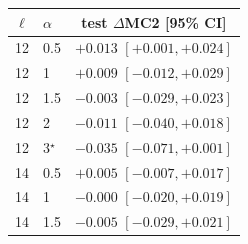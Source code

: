 \begin{tabular}{llc}
\toprule
$\ell$ & $\alpha$ & test $\Delta$MC2 [95\% CI] \\
\midrule
12 & 0.5 & $+0.013$ {\scriptsize $[+0.001, +0.024]$} \\
12 & 1 & $+0.009$ {\scriptsize $[-0.012, +0.029]$} \\
12 & 1.5 & $-0.003$ {\scriptsize $[-0.029, +0.023]$} \\
12 & 2 & $-0.011$ {\scriptsize $[-0.040, +0.018]$} \\
12 & 3$^{\star}$ & $-0.035$ {\scriptsize $[-0.071, +0.001]$} \\
14 & 0.5 & $+0.005$ {\scriptsize $[-0.007, +0.017]$} \\
14 & 1 & $-0.000$ {\scriptsize $[-0.020, +0.019]$} \\
14 & 1.5 & $-0.005$ {\scriptsize $[-0.029, +0.021]$} \\
\bottomrule
\end{tabular}
